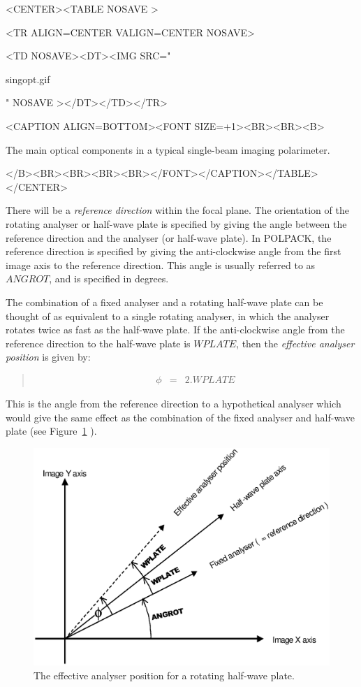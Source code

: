 \documentclass[twoside,11pt]{article}
\newenvironment{latexonly}{}{}
\newcommand{\latex}[1]{#1}
\newcommand{\html}[1]{}
\renewcommand{\_}{\texttt{\symbol{95}}}
\newcommand{\htmlfig}[3]{
   \label{#1}
   \begin{rawhtml} <CENTER><TABLE NOSAVE > \end{rawhtml}
   \begin{rawhtml} <TR ALIGN=CENTER VALIGN=CENTER NOSAVE> \end{rawhtml}
   \begin{rawhtml} <TD NOSAVE><DT><IMG SRC=" \end{rawhtml}
   #2
   \begin{rawhtml} " NOSAVE ></DT></TD></TR> \end{rawhtml}
   \begin{rawhtml} <CAPTION ALIGN=BOTTOM><FONT SIZE=+1><BR><BR><B> \end{rawhtml}
   #3 
   \begin{rawhtml} </B><BR><BR><BR><BR></FONT></CAPTION></TABLE></CENTER> \end{rawhtml}
}
\newenvironment{myquote}{\begin{quote}\begin{small}}{\end{small}\end{quote}}
\begin{document}
\begin{enumerate}
\begin{htmlonly}
\htmlfig{fig:singopt}{singopt.gif}{The main optical components in a typical single-beam imaging polarimeter.}
\end{htmlonly}

\end{enumerate}

There will be a \emph{reference direction} within the focal plane. The
orientation of the rotating analyser or half-wave plate is specified by 
giving the
angle between the reference direction and the analyser (or half-wave
plate). In POLPACK, the reference direction is specified by giving the
anti-clockwise angle from the first image axis to the reference
direction. This angle is usually referred to as $ANGROT$, and is specified in
degrees.

The combination of a fixed analyser and a rotating half-wave plate can be
thought of as equivalent to a single rotating analyser, in which the
analyser rotates twice as fast as the half-wave plate. If the
anti-clockwise angle from the reference direction to the half-wave plate
is $WPLATE$, then the \emph{effective analyser position} is given by:

\begin{myquote}
\begin{eqnarray*}
  \phi & = & 2.WPLATE
\end{eqnarray*}
\end{myquote}

This is the angle from the reference direction to a hypothetical analyser
which would give the same effect as the combination of the fixed analyser 
and half-wave plate (see \latex{Figure~\ref{fig:effan}} 
\html{the next figure}).

\begin{latexonly}
  \begin{figure}[htpb]
  \begin{center}
  \includegraphics[clip,scale=0.5]{sun223_figures/effan.eps}
  \vspace{4mm}
  \caption{The effective analyser position for a rotating half-wave plate.}
  \label{fig:effan}
  \end{center}
  \end{figure}
\end{latexonly}
\end{document}
